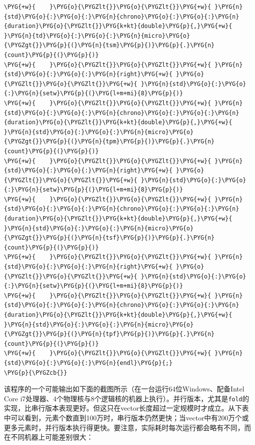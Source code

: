 \begin{codeblockbg}
\begin{Verbatim}[commandchars=\\\{\},breaklines=true,breakanywhere=true,fontsize=\codefont,xleftmargin=17bp]
\PYG{+w}{    }\PYG{o}{\PYGZlt{}}\PYG{o}{\PYGZlt{}}\PYG{+w}{ }\PYG{n}{std}\PYG{o}{:}\PYG{o}{:}\PYG{n}{chrono}\PYG{o}{:}\PYG{o}{:}\PYG{n}{duration}\PYG{o}{\PYGZlt{}}\PYG{k+kt}{double}\PYG{p}{,}\PYG{+w}{ }\PYG{n}{td}\PYG{o}{:}\PYG{o}{:}\PYG{n}{micro}\PYG{o}{\PYGZgt{}}\PYG{p}{(}\PYG{n}{tsm}\PYG{p}{)}\PYG{p}{.}\PYG{n}{count}\PYG{p}{(}\PYG{p}{)}
\PYG{+w}{    }\PYG{o}{\PYGZlt{}}\PYG{o}{\PYGZlt{}}\PYG{+w}{ }\PYG{n}{std}\PYG{o}{:}\PYG{o}{:}\PYG{n}{right}\PYG{+w}{ }\PYG{o}{\PYGZlt{}}\PYG{o}{\PYGZlt{}}\PYG{+w}{ }\PYG{n}{std}\PYG{o}{:}\PYG{o}{:}\PYG{n}{setw}\PYG{p}{(}\PYG{l+m+mi}{8}\PYG{p}{)}
\PYG{+w}{    }\PYG{o}{\PYGZlt{}}\PYG{o}{\PYGZlt{}}\PYG{+w}{ }\PYG{n}{std}\PYG{o}{:}\PYG{o}{:}\PYG{n}{chrono}\PYG{o}{:}\PYG{o}{:}\PYG{n}{duration}\PYG{o}{\PYGZlt{}}\PYG{k+kt}{double}\PYG{p}{,}\PYG{+w}{ }\PYG{n}{std}\PYG{o}{:}\PYG{o}{:}\PYG{n}{micro}\PYG{o}{\PYGZgt{}}\PYG{p}{(}\PYG{n}{tpm}\PYG{p}{)}\PYG{p}{.}\PYG{n}{count}\PYG{p}{(}\PYG{p}{)}
\PYG{+w}{    }\PYG{o}{\PYGZlt{}}\PYG{o}{\PYGZlt{}}\PYG{+w}{ }\PYG{n}{std}\PYG{o}{:}\PYG{o}{:}\PYG{n}{right}\PYG{+w}{ }\PYG{o}{\PYGZlt{}}\PYG{o}{\PYGZlt{}}\PYG{+w}{ }\PYG{n}{std}\PYG{o}{:}\PYG{o}{:}\PYG{n}{setw}\PYG{p}{(}\PYG{l+m+mi}{8}\PYG{p}{)}
\PYG{+w}{    }\PYG{o}{\PYGZlt{}}\PYG{o}{\PYGZlt{}}\PYG{+w}{ }\PYG{n}{std}\PYG{o}{:}\PYG{o}{:}\PYG{n}{chrono}\PYG{o}{:}\PYG{o}{:}\PYG{n}{duration}\PYG{o}{\PYGZlt{}}\PYG{k+kt}{double}\PYG{p}{,}\PYG{+w}{ }\PYG{n}{std}\PYG{o}{:}\PYG{o}{:}\PYG{n}{micro}\PYG{o}{\PYGZgt{}}\PYG{p}{(}\PYG{n}{tsf}\PYG{p}{)}\PYG{p}{.}\PYG{n}{count}\PYG{p}{(}\PYG{p}{)}
\PYG{+w}{    }\PYG{o}{\PYGZlt{}}\PYG{o}{\PYGZlt{}}\PYG{+w}{ }\PYG{n}{std}\PYG{o}{:}\PYG{o}{:}\PYG{n}{right}\PYG{+w}{ }\PYG{o}{\PYGZlt{}}\PYG{o}{\PYGZlt{}}\PYG{+w}{ }\PYG{n}{std}\PYG{o}{:}\PYG{o}{:}\PYG{n}{setw}\PYG{p}{(}\PYG{l+m+mi}{8}\PYG{p}{)}
\PYG{+w}{    }\PYG{o}{\PYGZlt{}}\PYG{o}{\PYGZlt{}}\PYG{+w}{ }\PYG{n}{std}\PYG{o}{:}\PYG{o}{:}\PYG{n}{chrono}\PYG{o}{:}\PYG{o}{:}\PYG{n}{duration}\PYG{o}{\PYGZlt{}}\PYG{k+kt}{double}\PYG{p}{,}\PYG{+w}{ }\PYG{n}{std}\PYG{o}{:}\PYG{o}{:}\PYG{n}{micro}\PYG{o}{\PYGZgt{}}\PYG{p}{(}\PYG{n}{tpf}\PYG{p}{)}\PYG{p}{.}\PYG{n}{count}\PYG{p}{(}\PYG{p}{)}
\PYG{+w}{    }\PYG{o}{\PYGZlt{}}\PYG{o}{\PYGZlt{}}\PYG{+w}{ }\PYG{n}{std}\PYG{o}{:}\PYG{o}{:}\PYG{n}{endl}\PYG{p}{;}
\PYG{p}{\PYGZcb{}}
\end{Verbatim}
\end{codeblockbg}



该程序的一个可能输出如下面的截图所示（在一台运行64位Windows、配备Intel Core i7处理器、4个物理核与8个逻辑核的机器上执行）。并行版本，尤其是\texttt{fold}的实现，比串行版本表现更好。但这只在vector长度超过一定规模时才成立。从下表中可以看到，元素个数直到100万时，串行版本仍然更快；当vector中有200万个或更多元素时，并行版本执行得更快。要注意，实际耗时每次运行都会略有不同，而在不同机器上可能差别很大：


